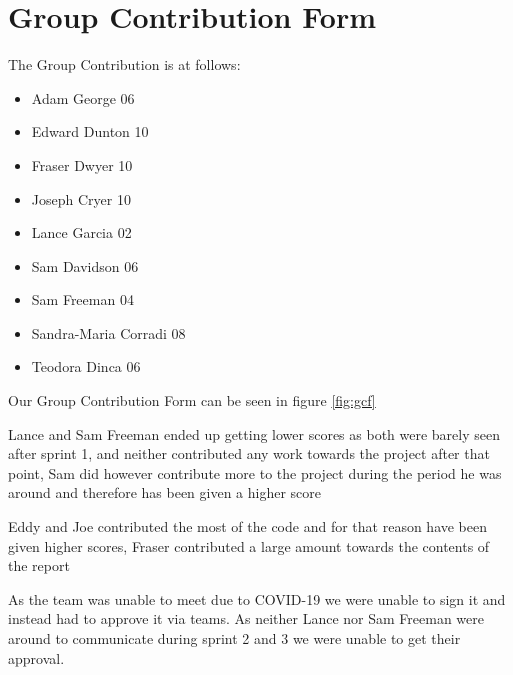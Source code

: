 \documentclass[10pt, notitlepage]{report}
\begin{document}
\section{Group Contribution Form}

The Group Contribution is at follows:
\begin{itemize}
\item Adam George			06
\item Edward Dunton		10
\item Fraser Dwyer			10
\item Joseph Cryer			10
\item Lance Garcia			02
\item Sam Davidson			06
\item Sam Freeman 			04
\item Sandra-Maria Corradi	08
\item Teodora Dinca    		06
\end{itemize}

Our Group Contribution Form can be seen in figure \ref{fig:gcf}

Lance and Sam Freeman ended up getting lower scores as both were barely seen after sprint 1, and neither contributed any work towards the project after that point, Sam did however contribute more to the project during the period he was around and therefore has been given a higher score

Eddy and Joe contributed the most of the code and for that reason have been given higher scores, Fraser contributed a large amount towards the contents of the report

As the team was unable to meet due to COVID-19 we were unable to sign it and instead had to approve it via teams. As neither Lance nor Sam Freeman were around to communicate during sprint 2 and 3 we were unable to get their approval.

\newpage
\end{document}
